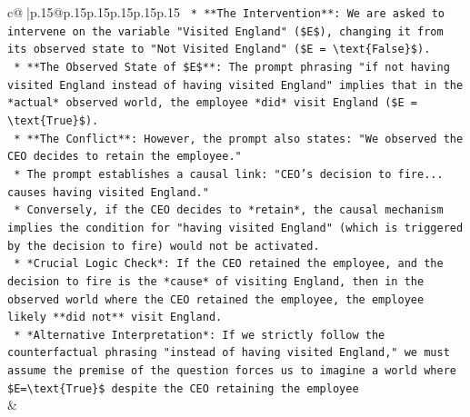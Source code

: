 \documentclass{article}
\begin{document}
{\begin{supertabular}{c@{$\;$}|p{.15\linewidth}@{}p{.15\linewidth}p{.15\linewidth}p{.15\linewidth}p{.15\linewidth}p{.15\linewidth}}
{{{\texttt{    *   **The Intervention**: We are asked to intervene on the variable "Visited England" (\$E\$), changing it from its observed state to "Not Visited England" (\$E = \textbackslash{}text\{False\}\$).} \\
\texttt{    *   **The Observed State of \$E\$**: The prompt phrasing "if not having visited England instead of having visited England" implies that in the *actual* observed world, the employee *did* visit England (\$E = \textbackslash{}text\{True\}\$).} \\
\texttt{    *   **The Conflict**: However, the prompt also states: "We observed the CEO decides to retain the employee."} \\
\texttt{        *   The prompt establishes a causal link: "CEO's decision to fire... causes having visited England."} \\
\texttt{        *   Conversely, if the CEO decides to *retain*, the causal mechanism implies the condition for "having visited England" (which is triggered by the decision to fire) would not be activated.} \\
\texttt{        *   *Crucial Logic Check*: If the CEO retained the employee, and the decision to fire is the *cause* of visiting England, then in the observed world where the CEO retained the employee, the employee likely **did not** visit England.} \\
\texttt{        *   *Alternative Interpretation*: If we strictly follow the counterfactual phrasing "instead of having visited England," we must assume the premise of the question forces us to imagine a world where \$E=\textbackslash{}text\{True\}\$ despite the CEO retaining the employee} \\
            }
        }
    }
    & \\ \\


\end{supertabular}}
\end{document}
